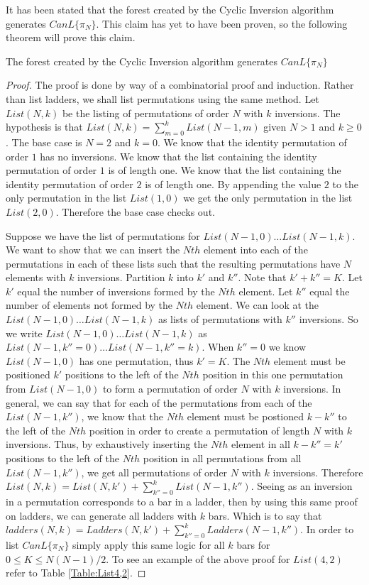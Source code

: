 It has been stated that the forest created by the Cyclic Inversion algorithm generates $CanL\{\pi_{N}\}$. This claim has 
yet to have been proven, so the following theorem will prove this claim.

\begin{theorem}
  
  The forest created by the Cyclic Inversion algorithm generates $CanL\{\pi_{N}\}$
\end{theorem}
\begin{proof}
  The proof is done by way of a combinatorial proof and induction. Rather than list ladders, we shall list permutations using the same method.  
  Let $List(N, k)$ be the listing of permutations of order $N$ with $k$ inversions. The hypothesis is that $List(N, k)=\sum_{m=0}^{k} List(N-1, m)$ 
  given $N>1$ and $k \geq 0$.
  The base case is $N=2$ and $k=0$. We know that the identity permutation of order $1$ has no inversions. We know that the list containing the identity 
  permutation of order $1$ is of length one. We know that the list containing the identity permutation of order $2$ is of length one. By appending the 
  value $2$ to the only permutation in the list $List(1, 0)$ we get the only permutation in the list $List(2, 0)$. Therefore the base case checks out.
  
  Suppose we have the list of permutations for $List(N-1, 0) \dots List(N-1, k)$. We want to show that we can insert the $Nth$ element into each of the
  permutations in each of these lists such that the resulting permutations have $N$ elements with $k$ inversions. Partition $k$ into $k'$ and $k''$. Note that 
  $k'+k''=K$.
  Let $k'$ equal the number of inversions formed by the $Nth$ element. Let $k''$ equal the number of elements not formed by the $Nth$ element.
  We can look at the $List(N-1, 0) \dots List(N-1, k)$ as lists of permutations with $k''$ inversions. So we write 
  $List(N-1, 0) \dots List(N-1, k)$ as $List(N-1, k''=0) \dots List(N-1, k''=k)$. When $k''=0$ we know $List(N-1, 0)$ has one permutation, thus $k'=K$.
  The $Nth$ element must be positioned $k'$ positions to the left of the $Nth$ position in this one permutation from $List(N-1, 0)$ to form a permutation of order $N$ with $k$ inversions. 
  In general, we can say that for each of the permutations from each of the $List(N-1, k'')$, we know that the $Nth$ element must be postioned $k-k''$ to the left of the $Nth$ position in order to 
  create a permutation of length $N$ with $k$ inversions. Thus, by exhaustively inserting the $Nth$ element in all $k-k''=k'$ positions to the left of the $Nth$ position 
  in all permutations from all $List(N-1, k'')$, we get all permutations of order $N$ with $k$ inversions. 
  Therefore $List(N, k) = List(N, k') + \sum_{k''=0}^{k} List(N-1, k'') $.
  Seeing as an inversion in a permutation corresponds to a bar in 
  a ladder, then by using this same proof on ladders, we can generate all ladders with $k$ bars. 
  Which is to say that $ladders(N, k) = Ladders(N, k') + \sum_{k''=0}^{k} Ladders(N-1, k'')$.
  In order to list $CanL\{\pi_{N}\}$ simply apply this same logic for all $k$ bars for $0 \leq K \leq N(N-1)/2$. To see an example of the above proof for $List(4, 2)$ refer to Table \ref{Table:List4,2}.


\end{proof}
